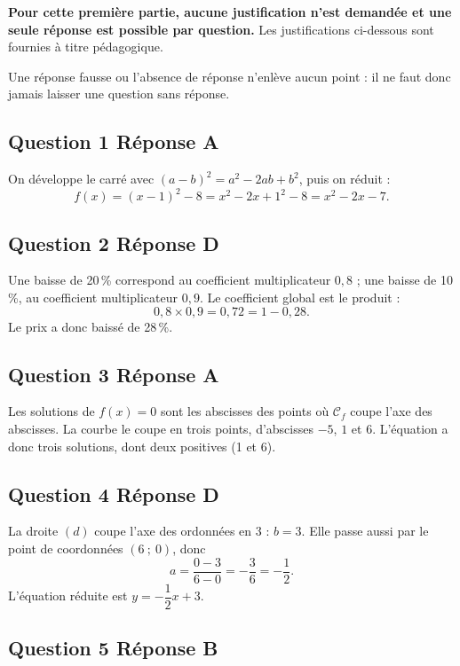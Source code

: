 \textbf{Pour cette première partie, aucune justification n'est demandée et une seule réponse est possible par question.} Les justifications ci-dessous sont fournies à titre pédagogique.

Une réponse fausse ou l'absence de réponse n'enlève aucun point : il ne faut donc jamais laisser une question sans réponse.

\subsection*{Question 1 \quad Réponse A}

On développe le carré avec $(a-b)^2 = a^2 - 2ab + b^2$, puis on réduit :
\[f(x) = (x-1)^2 - 8 = x^2 - 2x + 1^2 - 8 = x^2 - 2x - 7.\]

\subsection*{Question 2 \quad Réponse D}

Une baisse de 20\,\% correspond au coefficient multiplicateur $0,8$ ; une baisse de
10\,\%, au coefficient multiplicateur $0,9$. Le coefficient global est le produit :
\[0,8 \times 0,9 = 0,72 = 1 - 0,28.\]
Le prix a donc baissé de 28\,\%.

\subsection*{Question 3 \quad Réponse A}

Les solutions de $f(x) = 0$ sont les abscisses des points où $\mathcal{C}_f$ coupe l'axe des
abscisses. La courbe le coupe en trois points, d'abscisses $-5$, $1$ et $6$. L'équation a
donc trois solutions, dont deux positives (1 et 6).

\subsection*{Question 4 \quad Réponse D}

La droite $(d)$ coupe l'axe des ordonnées en 3 : $b = 3$. Elle passe aussi par le point
de coordonnées $(6~;~0)$, donc
\[a = \dfrac{0 - 3}{6 - 0} = -\dfrac{3}{6} = -\dfrac{1}{2}.\]
L'équation réduite est $y = -\dfrac{1}{2}x + 3$.

\subsection*{Question 5 \quad Réponse B}

